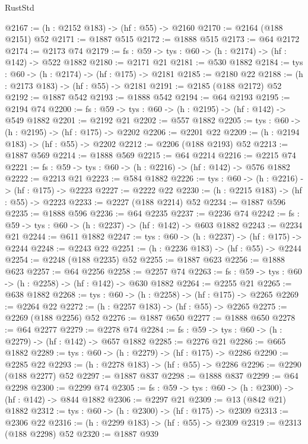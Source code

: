 \begin{lexlean}{RustStd}
\begin{coremodule}
@2167 := (h : @2152 @183) -> (hf : @55) -> @2160
@2170 := @2164 (@188 @2151) @52
@2171 := @1887 @515
@2172 := @1888 @515
@2173 := @64 @2172
@2174 := @2173 @74
@2179 := {fs : @59} -> {tys : @60} -> (h : @2174) -> (hf : @142) -> @522 @1882
@2180 := @2171 @21
@2181 := @530 @1882
@2184 := {tys : @60} -> (h : @2174) -> (hf : @175) -> @2181
@2185 := @2180 @22
@2188 := (h : @2173 @183) -> (hf : @55) -> @2181
@2191 := @2185 (@188 @2172) @52
@2192 := @1887 @542
@2193 := @1888 @542
@2194 := @64 @2193
@2195 := @2194 @74
@2200 := {fs : @59} -> {tys : @60} -> (h : @2195) -> (hf : @142) -> @549 @1882
@2201 := @2192 @21
@2202 := @557 @1882
@2205 := {tys : @60} -> (h : @2195) -> (hf : @175) -> @2202
@2206 := @2201 @22
@2209 := (h : @2194 @183) -> (hf : @55) -> @2202
@2212 := @2206 (@188 @2193) @52
@2213 := @1887 @569
@2214 := @1888 @569
@2215 := @64 @2214
@2216 := @2215 @74
@2221 := {fs : @59} -> {tys : @60} -> (h : @2216) -> (hf : @142) -> @576 @1882
@2222 := @2213 @21
@2223 := @584 @1882
@2226 := {tys : @60} -> (h : @2216) -> (hf : @175) -> @2223
@2227 := @2222 @22
@2230 := (h : @2215 @183) -> (hf : @55) -> @2223
@2233 := @2227 (@188 @2214) @52
@2234 := @1887 @596
@2235 := @1888 @596
@2236 := @64 @2235
@2237 := @2236 @74
@2242 := {fs : @59} -> {tys : @60} -> (h : @2237) -> (hf : @142) -> @603 @1882
@2243 := @2234 @21
@2244 := @611 @1882
@2247 := {tys : @60} -> (h : @2237) -> (hf : @175) -> @2244
@2248 := @2243 @22
@2251 := (h : @2236 @183) -> (hf : @55) -> @2244
@2254 := @2248 (@188 @2235) @52
@2255 := @1887 @623
@2256 := @1888 @623
@2257 := @64 @2256
@2258 := @2257 @74
@2263 := {fs : @59} -> {tys : @60} -> (h : @2258) -> (hf : @142) -> @630 @1882
@2264 := @2255 @21
@2265 := @638 @1882
@2268 := {tys : @60} -> (h : @2258) -> (hf : @175) -> @2265
@2269 := @2264 @22
@2272 := (h : @2257 @183) -> (hf : @55) -> @2265
@2275 := @2269 (@188 @2256) @52
@2276 := @1887 @650
@2277 := @1888 @650
@2278 := @64 @2277
@2279 := @2278 @74
@2284 := {fs : @59} -> {tys : @60} -> (h : @2279) -> (hf : @142) -> @657 @1882
@2285 := @2276 @21
@2286 := @665 @1882
@2289 := {tys : @60} -> (h : @2279) -> (hf : @175) -> @2286
@2290 := @2285 @22
@2293 := (h : @2278 @183) -> (hf : @55) -> @2286
@2296 := @2290 (@188 @2277) @52
@2297 := @1887 @837
@2298 := @1888 @837
@2299 := @64 @2298
@2300 := @2299 @74
@2305 := {fs : @59} -> {tys : @60} -> (h : @2300) -> (hf : @142) -> @844 @1882
@2306 := @2297 @21
@2309 := @13 (@842 @21) @1882
@2312 := {tys : @60} -> (h : @2300) -> (hf : @175) -> @2309
@2313 := @2306 @22
@2316 := (h : @2299 @183) -> (hf : @55) -> @2309
@2319 := @2313 (@188 @2298) @52
@2320 := @1887 @939

\end{coremodule}
\end{lexlean}
